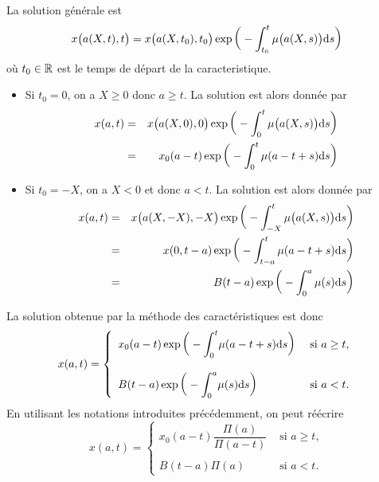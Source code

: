 La solution générale est
\begin{equation*}
    x\big(a(X,t),t\big) = x\big(a(X,t_0),t_0\big)\exp\bigg(-\int_{t_0}^t\mu\big(a(X,s)\big)\mathrm{d} s\bigg)
\end{equation*}
où $t_0 \in \mathbb{R}$ est le temps de départ de la caracteristique.
\begin{itemize}
    \item Si $t_0=0$, on a $X \geq 0$ donc $a \geq t$. La solution
    est alors donnée par 
    \begin{eqnarray*}
        x(a,t) &=& x\big(a(X,0),0\big)\exp\bigg(-\int_{0}^t\mu\big(a(X,s)\big)\mathrm{d} s\bigg) \\
        &=& x_0(a-t)\exp\bigg(-\int_{0}^t\mu(a-t+s)\mathrm{d} s\bigg)
    \end{eqnarray*}
    \item Si $t_0=-X$, on a $X<0$ et donc $a<t$. La solution est 
    alors donnée par 
    \begin{eqnarray*}
        x(a,t) &=& x\big(a(X,-X),-X\big)\exp\bigg(-\int_{-X}^t\mu\big(a(X,s)\big)\mathrm{d} s\bigg) \\
        &=& x(0,t-a)\exp\bigg(-\int_{t-a}^t\mu(a-t+s)\mathrm{d} s\bigg) \\
        &=& B(t-a)\exp\bigg(-\int_{0}^a\mu(s)\mathrm{d} s\bigg)
    \end{eqnarray*}
\end{itemize}
La solution obtenue par la méthode des caractéristiques est donc 
\begin{eqnarray*}
    x(a,t) = \left\{\begin{array}{lc}
        x_0(a - t)\exp\bigg(-\displaystyle{\int_{0}^t}\mu (a-t+s)\mathrm{d} s\bigg) & \text{ si } a \geq t, \\
        & \\
        B(t-a)\exp\bigg(-\displaystyle{\int_0^a}\mu(s)\mathrm{d} s\bigg) & \text{ si } a < t.
    \end{array}\right.
\end{eqnarray*}
En utilisant les notations introduites précédemment, on peut réécrire 
\begin{equation}\label{sol_caracteristiques}
    x(a,t) = \left\{\begin{array}{lc}
        x_0(a - t)\dfrac{\Pi(a)}{\Pi(a-t)} & \text{ si } a \geq t, \\
        & \\
        B(t-a)\Pi(a) & \text{ si } a < t.
    \end{array}\right.
\end{equation}

